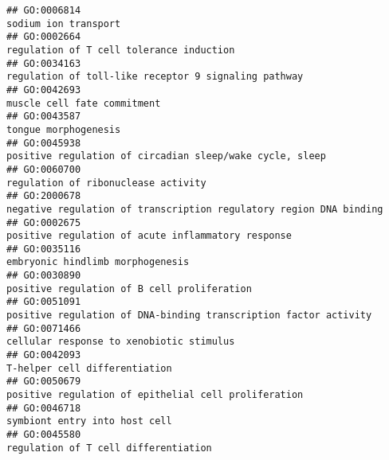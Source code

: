 \documentclass[
]{article}
\begin{document}
\begin{verbatim}
## GO:0006814                                                                                                                             sodium ion transport
## GO:0002664                                                                                                         regulation of T cell tolerance induction
## GO:0034163                                                                                             regulation of toll-like receptor 9 signaling pathway
## GO:0042693                                                                                                                      muscle cell fate commitment
## GO:0043587                                                                                                                             tongue morphogenesis
## GO:0045938                                                                                         positive regulation of circadian sleep/wake cycle, sleep
## GO:0060700                                                                                                              regulation of ribonuclease activity
## GO:2000678                                                                               negative regulation of transcription regulatory region DNA binding
## GO:0002675                                                                                               positive regulation of acute inflammatory response
## GO:0035116                                                                                                                 embryonic hindlimb morphogenesis
## GO:0030890                                                                                                      positive regulation of B cell proliferation
## GO:0051091                                                                                 positive regulation of DNA-binding transcription factor activity
## GO:0071466                                                                                                         cellular response to xenobiotic stimulus
## GO:0042093                                                                                                                    T-helper cell differentiation
## GO:0050679                                                                                             positive regulation of epithelial cell proliferation
## GO:0046718                                                                                                                    symbiont entry into host cell
## GO:0045580                                                                                                             regulation of T cell differentiation

\end{verbatim}
\end{document}
